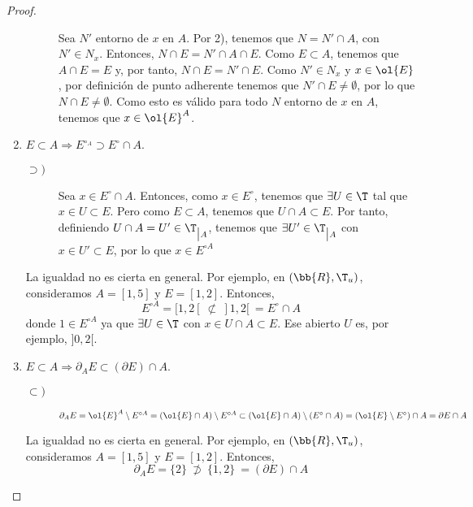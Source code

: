 \begin{proof}
\begin{enumerate}
\begin{description}
        Sea $N'$ entorno de $x$ en $A$. Por 2), tenemos que $N=N'\cap A$, con $N'\in N_x$. Entonces, $N\cap E= N'\cap A\cap E$. Como $E\subset A$, tenemos que $A\cap E=E$ y, por tanto, $N\cap E=N'\cap E$.
        Como $N'\in N_x$ y $x\in \ol{E}$, por definición de punto adherente tenemos que $N'\cap E\neq \emptyset$, por lo que $N\cap E\neq \emptyset$. Como esto es válido para todo $N$ entorno de $x$ en $A$, tenemos que $x\in \ol{E}^A$.
    \end{description}
    
    \item $E\subset A\Longrightarrow E^{\circ_A} \supset E^\circ \cap A$.

    \begin{description}
        \item[$\supset)$] Sea $x\in E^\circ \cap A$. Entonces, como $x\in E^\circ$, tenemos que $\exists U\in \T$ tal que $x\in U\subset E$. Pero como $E\subset A$, tenemos que $U\cap A\subset E$. Por tanto, definiendo $U\cap A=U'\in \T_{\big| A}$, tenemos que $\exists U'\in \T_{\big| A}$ con $x\in U'\subset E$, por lo que $x\in E^{\circ A}$
    \end{description}

    La igualdad no es cierta en general. Por ejemplo, en $(\bb{R},\T_u)$, consideramos $A=[1,5]$ y $E=[1,2]$. Entonces,
    $$ E^{\circ A} = [1,2[ ~\not \subset~ ]1,2[~ = E^\circ \cap A$$
    donde $1\in E^{\circ A}$ ya que $\exists U\in \T$ con $x\in U\cap A\subset E$. Ese abierto $U$ es, por ejemplo, $]0, 2[$.
    
    \item $E\subset A\Longrightarrow \partial_AE \subset (\partial E)\cap A$.

     \begin{description}
        \item[$\subset)$] $\partial_A E = \ol{E}^{A}\setminus E^{\circ A} = (\ol{E}\cap A)\setminus E^{\circ A} \subset (\ol{E}\cap A)\setminus (E^\circ \cap A) = (\ol{E}\setminus E^\circ)\cap A =\partial E\cap A$
    \end{description}

    La igualdad no es cierta en general. Por ejemplo, en $(\bb{R},\T_u)$, consideramos $A=[1,5]$ y $E=[1,2]$. Entonces,
    $$ \partial_A E = \{2\} ~\not \supset~ \{1,2\}~ = (\partial E) \cap A$$

\end{enumerate}
\end{proof}




